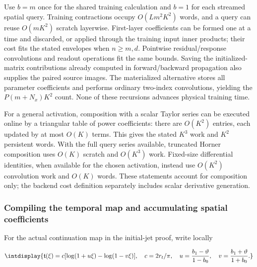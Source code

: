 
Use \(b=m\) once for the shared training calculation and \(b=1\) for each streamed spatial query. Training contractions occupy \(O(Lm^2K^2)\) words, and a query can reuse \(O(mK^2)\) scratch layerwise. First-layer coefficients can be formed one at a time and discarded, or applied through the training input inner products; their cost fits the stated envelopes when \(n\ge m,\allowbreak d\). Pointwise residual/response convolutions and readout operations fit the same bounds. Saving the initialized-matrix contributions already computed in forward/backward propagation also supplies the paired source images. The materialized alternative stores all parameter coefficients and performs ordinary two-index convolutions, yielding the \(P(m+N_x)K^2\) count. None of these recursions advances physical training time.



For a general activation, composition with a scalar Taylor series can be executed online by a triangular table of power coefficients: there are \(O(K^2)\) entries, each updated by at most \(O(K)\) terms. This gives the stated \(K^3\) work and \(K^2\) persistent words. With the full query series available, truncated Horner composition uses \(O(K)\) scratch and \(O(K^3)\) work. Fixed-size differential identities, when available for the chosen activation, instead use \(O(K^2)\) convolution work and \(O(K)\) words. These statements account for composition only; the backend cost definition separately includes scalar derivative generation.


\subsubsection{Compiling the temporal map and accumulating spatial coefficients}



For the actual continuation map in the initial-jet proof, write locally


\begingroup\renewcommand{\theHequation}{intdisplay.830}
\begin{equation*}
\intdisplay{
\mathfrak t(\xi)=c[\log(1+u\xi)-\log(1-v\xi)],\quad
c=2r_t/\pi,\quad
u=\frac{b_1-\vartheta}{1-b_0},\quad
v=\frac{b_1+\vartheta}{1+b_0}.
}
\end{equation*}
\endgroup


